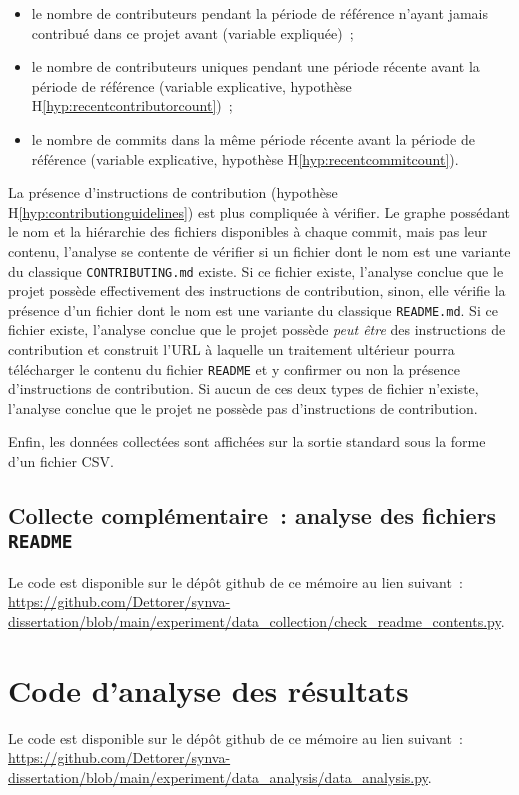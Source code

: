 \begin{itemize}
    \item le nombre de contributeurs pendant la période de référence n'ayant jamais contribué dans ce projet
        avant (variable expliquée) ;
    \item le nombre de contributeurs uniques pendant une période récente avant la période de référence
        (variable explicative, hypothèse H\ref{hyp:recentcontributorcount}) ;
    \item le nombre de \glspl{commit} dans la même période récente avant la période de référence (variable
        explicative, hypothèse H\ref{hyp:recentcommitcount}).
\end{itemize}

La présence d'instructions de contribution (hypothèse H\ref{hyp:contributionguidelines}) est plus compliquée à
vérifier. Le graphe possédant le nom et la hiérarchie des fichiers disponibles à chaque \gls{commit}, mais pas
leur contenu, l'analyse se contente de vérifier si un fichier dont le nom est une variante du classique
\texttt{CONTRIBUTING.md} existe. Si ce fichier existe, l'analyse conclue que le projet possède effectivement
des instructions de contribution, sinon, elle vérifie la présence d'un fichier dont le nom est une variante du
classique \texttt{README.md}. Si ce fichier existe, l'analyse conclue que le projet possède \emph{peut être}
des instructions de contribution et construit l'URL à laquelle un traitement ultérieur pourra télécharger le
contenu du fichier \texttt{README} et y confirmer ou non la présence d'instructions de contribution. Si aucun
de ces deux types de fichier n'existe, l'analyse conclue que le projet ne possède pas d'instructions de
contribution.

Enfin, les données collectées sont affichées sur la sortie standard sous la forme d'un fichier CSV.

\section{Collecte complémentaire : analyse des fichiers \texttt{README}}
\label{app:checkreadme.py}

Le code est disponible sur le dépôt \gls{github} de ce mémoire au lien suivant :
\url{https://github.com/Dettorer/synva-dissertation/blob/main/experiment/data_collection/check_readme_contents.py}.


\chapter{Code d'analyse des résultats}
\label{app:analysis.py}

Le code est disponible sur le dépôt \gls{github} de ce mémoire au lien suivant :
\url{https://github.com/Dettorer/synva-dissertation/blob/main/experiment/data_analysis/data_analysis.py}.


